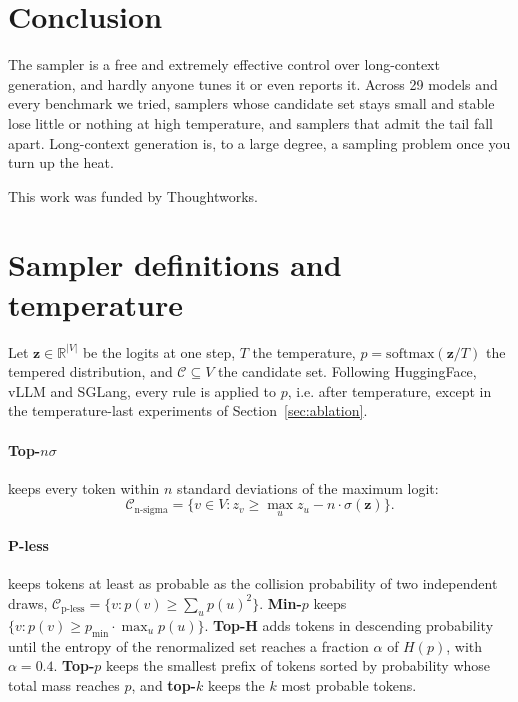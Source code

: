 \documentclass{article}
\begin{document}
\section{Conclusion}
\label{sec:conclusion}

The sampler is a free and extremely effective control over long-context generation, and hardly anyone tunes it or even reports it. Across 29 models and every benchmark we tried, samplers whose candidate set stays small and stable lose little or nothing at high temperature, and samplers that admit the tail fall apart. Long-context generation is, to a large degree, a sampling problem once you turn up the heat.

\begin{ack}
This work was funded by Thoughtworks.
\end{ack}





\newpage
\appendix

\section{Sampler definitions and temperature}
\label{app:defs}

Let $\mathbf{z}\in\mathbb{R}^{|V|}$ be the logits at one step, $T$ the temperature, $p=\mathrm{softmax}(\mathbf{z}/T)$ the tempered distribution, and $\mathcal{C}\subseteq V$ the candidate set. Following HuggingFace, vLLM and SGLang, every rule is applied to $p$, i.e. after temperature, except in the temperature-last experiments of Section~\ref{sec:ablation}.

\paragraph{Top-$n\sigma$} keeps every token within $n$ standard deviations of the maximum logit:
\begin{equation}
\mathcal{C}_{\text{n-sigma}} = \{v \in V : z_v \ge \max_{u} z_u - n \cdot \sigma(\mathbf{z})\}.
\label{eq:nsigma}
\end{equation}
\paragraph{P-less} keeps tokens at least as probable as the collision probability of two independent draws, $\mathcal{C}_{\text{p-less}} = \{v : p(v) \ge \sum_u p(u)^2\}$. \textbf{Min-$p$} keeps $\{v : p(v) \ge p_{\min}\cdot\max_u p(u)\}$. \textbf{Top-H} adds tokens in descending probability until the entropy of the renormalized set reaches a fraction $\alpha$ of $H(p)$, with $\alpha{=}0.4$. \textbf{Top-$p$} keeps the smallest prefix of tokens sorted by probability whose total mass reaches $p$, and \textbf{top-$k$} keeps the $k$ most probable tokens.
\end{document}
